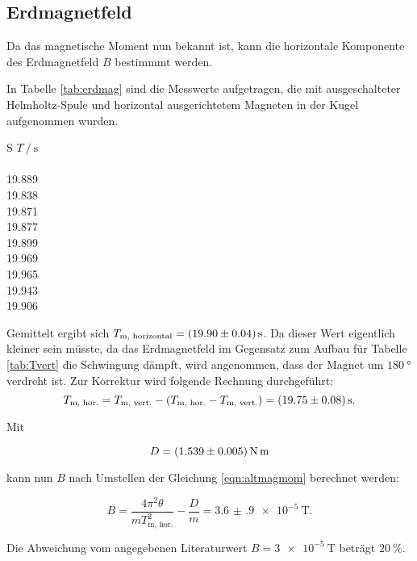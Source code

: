 \FloatBarrier

\subsection{Erdmagnetfeld}

Da das magnetische Moment nun bekannt ist, kann die horizontale Komponente des
Erdmagnetfeld $B$ bestimmmt werden.

In Tabelle \ref{tab:erdmag} sind die Messwerte aufgetragen, die mit ausgeschalteter
Helmholtz-Spule und horizontal ausgerichtetem Magneten in der Kugel aufgenommen wurden.

\begin{table}[h]
  \centering
  \caption{Messwerte der Periodendauern bei horizontalem Magnet in der Kugel.}
  \label{tab:erdmag}
  \begin{tabular}{S}
    \toprule
    {$T\:/\:\si{\second}$} \\
     \\
    19.889 \\
    19.838 \\
    19.871 \\
    19.877 \\
    19.899 \\
    19.969 \\
    19.965 \\
    19.943 \\
    19.906 \\
    \bottomrule
  \end{tabular}
\end{table}

Gemittelt ergibt sich $T_{\text{m, horizontal}} = \SI{19.90 +- 0.04}{\second}$.
Da dieser Wert eigentlich kleiner sein müsste, da das Erdmagnetfeld im Gegensatz
zum Aufbau für Tabelle \ref{tab:Tvert} die Schwingung dämpft, wird angenommen, dass
der Magnet um $\SI{180}{\degree}$ verdreht ist. Zur Korrektur wird folgende Rechnung durchgeführt:
\begin{equation}
  T_{\text{m, hor.}} = T_{\text{m, vert.}} - (T_{\text{m, hor.}}-T_{\text{m, vert.}}) = \SI{19.75 +- 0.08}{\second}.
\end{equation}


Mit

\begin{equation}
  D = \SI{1.539 +- 0.005}{\newton\meter}
\end{equation}

kann nun $B$ nach Umstellen der Gleichung \eqref{eqn:altmagmom} berechnet werden:

\begin{equation}
  B = \frac{4\pi^2\theta}{m T_{\text{m, hor.}}^2} - \frac{D}{m} = \SI{3.6(9)e-5}{\tesla}.
\end{equation}

Die Abweichung vom angegebenen Literaturwert $B = \SI{3e-5}{\tesla}$ beträgt $\SI{20}{\percent}$.
